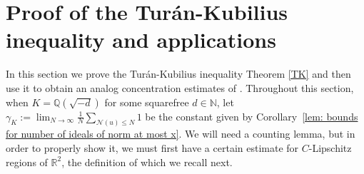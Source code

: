 \documentclass[11pt]{amsart}
\newtheorem{lemma}{Lemma}[section]
\theoremstyle{definition}
\newcommand{\N}{{\mathbb N}}
\newcommand{\NN}{{\mathcal N}}
\newcommand{\Q}{{\mathbb Q}}
\newcommand{\R}{{\mathbb R}}
\newcommand{\WS}[1]{{\color{blue}{{#1}}}}
\begin{document}
 \fi


\section{Proof of the Tur\'an-Kubilius inequality and applications}\label{SECconcest}
In this section we prove the  Tur\'an-Kubilius inequality Theorem \ref{TK} and then use it to obtain an analog concentration estimates of \cite[Proposition~2.5]{FKM1}.
%
%
%
Throughout this section, when $K=\Q(\sqrt{-d})$ for some squarefree $d\in\N$,
let $\gamma_{K}:=\lim_{N \to \infty} \frac{1}{N}\sum_{\NN(u) \leq N} 1$
 be the constant given by Corollary~\ref{lem: bounds for number of ideals of norm at most x}.
 We will need a counting lemma, but in order to properly show it, we must first have a certain estimate for $C$-Lipschitz regions of $\R^2$, the definition of which we recall next.

\end{document}
